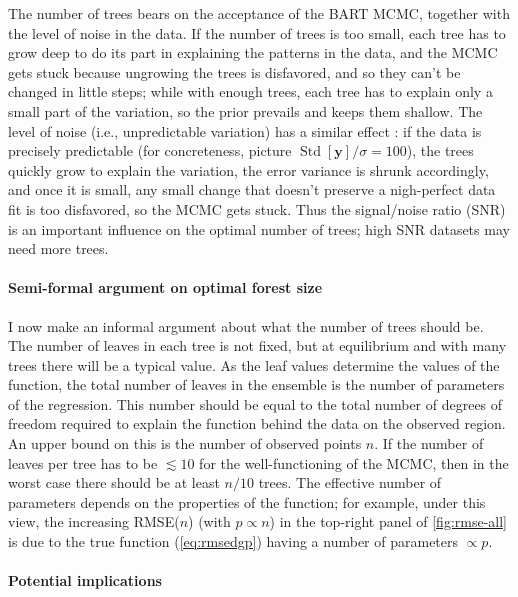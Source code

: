 \documentclass{article}
\begin{document}
    The number of trees bears on the acceptance of the BART MCMC, together with the level of noise in the data. If the number of trees is too small, each tree has to grow deep to do its part in explaining the patterns in the data, and the MCMC gets stuck because ungrowing the trees is disfavored, and so they can't be changed in little steps; while with enough trees, each tree has to explain only a small part of the variation, so the prior prevails and keeps them shallow. The level of noise (i.e., unpredictable variation) has a similar effect \citep{pratola2016}: if the data is precisely predictable (for concreteness, picture $\operatorname{Std}[\mathbf y]/\sigma = 100$), the trees quickly grow to explain the variation, the error variance is shrunk accordingly, and once it is small, any small change that doesn't preserve a nigh-perfect data fit is too disfavored, so the MCMC gets stuck. Thus the signal/noise ratio (SNR) is an important influence on the optimal number of trees; high SNR datasets may need more trees.

    \paragraph{Semi-formal argument on optimal forest size}

    I now make an informal argument about what the number of trees should be. The number of leaves in each tree is not fixed, but at equilibrium and with many trees there will be a typical value. As the leaf values determine the values of the function, the total number of leaves in the ensemble is the number of parameters of the regression. This number should be equal to the total number of degrees of freedom required to explain the function behind the data on the observed region. An upper bound on this is the number of observed points $n$. If the number of leaves per tree has to be $\lesssim 10$ for the well-functioning of the MCMC, then in the worst case there should be at least $n/10$ trees. The effective number of parameters depends on the properties of the function; for example, under this view, the increasing RMSE($n$) (with $p \propto n$) in the top-right panel of \autoref{fig:rmse-all} is due to the true function (\autoref{eq:rmsedgp}) having a number of parameters $\propto p$.

    \paragraph{Potential implications}
\end{document}
